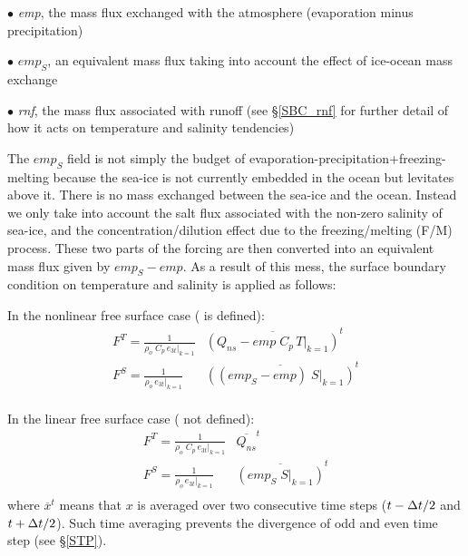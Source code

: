 $\bullet$ \textit{emp}, the mass flux exchanged with the atmosphere (evaporation minus precipitation)

$\bullet$ $\textit{emp}_S$, an equivalent mass flux taking into account the effect of ice-ocean mass exchange

$\bullet$ \textit{rnf}, the mass flux associated with runoff (see \S\ref{SBC_rnf} for further detail of how it acts on temperature and salinity tendencies)

The $\textit{emp}_S$ field is not simply the budget of evaporation-precipitation+freezing-melting because 
the sea-ice is not currently embedded in the ocean but levitates above it. There is no mass
exchanged between the sea-ice and the ocean. Instead we only take into account the salt
flux associated with the non-zero salinity of sea-ice, and the concentration/dilution effect
due to the freezing/melting (F/M) process. These two parts of the forcing are then converted into 
an equivalent mass flux given by $\textit{emp}_S - \textit{emp}$. As a result of this mess, 
the surface boundary condition on temperature and salinity is applied as follows:

In the nonlinear free surface case ( is defined):
\begin{equation} \label{Eq_tra_sbc}
\begin{aligned}
 &F^T = \frac{ 1 }{\rho _o \;C_p \,\left. e_{3t} \right|_{k=1} }   
           &\overline{ \left( Q_{ns} - \textit{emp}\;C_p\,\left. T \right|_{k=1} \right) }^t  & \\ 
%
& F^S =\frac{ 1 }{\rho _o \,\left. e_{3t} \right|_{k=1} } 
           &\overline{ \left( (\textit{emp}_S - \textit{emp})\;\left. S \right|_{k=1}  \right) }^t   & \\   
 \end{aligned}
\end{equation} 

In the linear free surface case ( not defined):
\begin{equation} \label{Eq_tra_sbc_lin}
\begin{aligned}
 &F^T = \frac{ 1 }{\rho _o \;C_p \,\left. e_{3t} \right|_{k=1} }  &\overline{ Q_{ns} }^t  & \\ 
%
& F^S =\frac{ 1 }{\rho _o \,\left. e_{3t} \right|_{k=1} } 
           &\overline{ \left( \textit{emp}_S\;\left. S \right|_{k=1}  \right) }^t   & \\   
 \end{aligned}
\end{equation} 
where $\overline{x }^t$ means that $x$ is averaged over two consecutive time steps 
($t-\Delta t/2$ and $t+\Delta t/2$). Such time averaging prevents the 
divergence of odd and even time step (see \S\ref{STP}).

